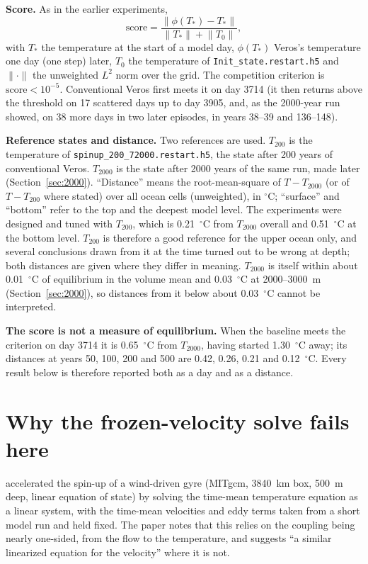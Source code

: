 \documentclass{article}
\begin{document}
\textbf{Score.} As in the earlier experiments,
\[
\text{score} = \frac{\lVert \phi(T_\ast) - T_\ast \rVert}{\lVert T_\ast \rVert + \lVert T_0 \rVert},
\]
with $T_\ast$ the temperature at the start of a model day, $\phi(T_\ast)$ Veros's temperature one day (one step) later, $T_0$ the temperature of \texttt{Init\_state.restart.h5} and $\lVert\cdot\rVert$ the unweighted $L^2$ norm over the grid. The competition criterion is $\text{score}<10^{-5}$. Conventional Veros first meets it on day 3714 (it then returns above the threshold on 17 scattered days up to day 3905, and, as the 2000-year run showed, on 38 more days in two later episodes, in years 38--39 and 136--148).

\textbf{Reference states and distance.} Two references are used. $T_{200}$ is the temperature of \texttt{spinup\_200\_72000.restart.h5}, the state after 200 years of conventional Veros. $T_{2000}$ is the state after 2000 years of the same run, made later (Section~\ref{sec:2000}). ``Distance'' means the root-mean-square of $T-T_{2000}$ (or of $T-T_{200}$ where stated) over all ocean cells (unweighted), in $^\circ$C; ``surface'' and ``bottom'' refer to the top and the deepest model level. The experiments were designed and tuned with $T_{200}$, which is 0.21~$^\circ$C from $T_{2000}$ overall and 0.51~$^\circ$C at the bottom level. $T_{200}$ is therefore a good reference for the upper ocean only, and several conclusions drawn from it at the time turned out to be wrong at depth; both distances are given where they differ in meaning. $T_{2000}$ is itself within about 0.01~$^\circ$C of equilibrium in the volume mean and 0.03~$^\circ$C at 2000--3000~m (Section~\ref{sec:2000}), so distances from it below about 0.03~$^\circ$C cannot be interpreted.

\textbf{The score is not a measure of equilibrium.} When the baseline meets the criterion on day 3714 it is 0.65~$^\circ$C from $T_{2000}$, having started 1.30~$^\circ$C away; its distances at years 50, 100, 200 and 500 are 0.42, 0.26, 0.21 and 0.12~$^\circ$C. Every result below is therefore reported both as a day and as a distance.

\section{Why the frozen-velocity solve fails here}\label{sec:why}

\citet{cooper2017} accelerated the spin-up of a wind-driven gyre (MITgcm, 3840~km box, 500~m deep, linear equation of state) by solving the time-mean temperature equation as a linear system, with the time-mean velocities and eddy terms taken from a short model run and held fixed. The paper notes that this relies on the coupling being nearly one-sided, from the flow to the temperature, and suggests ``a similar linearized equation for the velocity'' where it is not.
\end{document}

